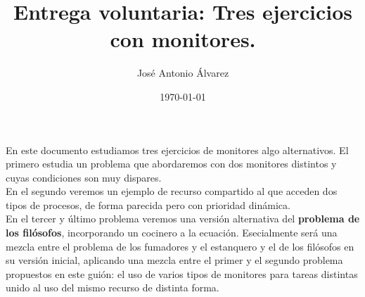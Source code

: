 \documentclass[11pt,a4paper]{article}
\title{Entrega voluntaria: Tres ejercicios con monitores.}
\author{José Antonio Álvarez}
\date{\today}
\begin{document}
\maketitle

En este documento estudiamos tres ejercicios de monitores algo alternativos. El primero estudia un problema que abordaremos con dos monitores distintos y cuyas condiciones son muy dispares. \\ 

En el segundo veremos un ejemplo de recurso compartido al que acceden dos tipos de procesos, de forma parecida pero con prioridad dinámica. \\

En el tercer y último problema veremos una versión alternativa del \textbf{problema de los filósofos}, incorporando un cocinero a la ecuación. Esecialmente será una mezcla entre el problema de los fumadores y el estanquero y el de los filósofos en su versión inicial, aplicando una mezcla entre el primer y el segundo problema propuestos en este guión: el uso de varios tipos de monitores para tareas distintas unido al uso del mismo recurso de distinta forma. \\
\end{document}
